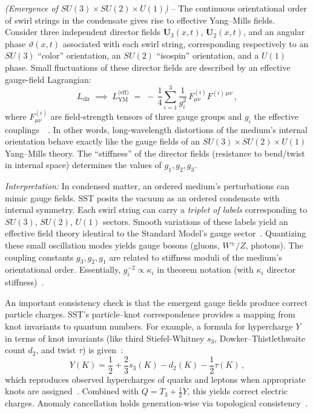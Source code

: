 \documentclass[aps,onecolumn,10pt,nofootinbib]{revtex4}
\begin{document}
	\begin{tcolorbox}[title=Theorem 6.1: Emergent Yang–Mills Fields]
		\emph{(Emergence of $SU(3)\times SU(2)\times U(1)$)} – The continuous orientational order of swirl strings in the condensate gives rise to effective Yang–Mills fields. Consider three independent director fields $\mathbf{U}_3(x,t)$, $\mathbf{U}_2(x,t)$, and an angular phase $\vartheta(x,t)$ associated with each swirl string, corresponding respectively to an $SU(3)$ “color” orientation, an $SU(2)$ “isospin” orientation, and a $U(1)$ phase. Small fluctuations of these director fields are described by an effective gauge-field Lagrangian:
		\[
			L_{\text{dir}} \;\implies\; L_{\text{YM}}^{\text{(eff)}} \;=\; -\,\frac{1}{4}\sum_{i=1}^3 \frac{1}{g_i^2}\,F^{(i)}_{\mu\nu} F^{(i)\,\mu\nu}\,,
		\]
		where $F_{\mu\nu}^{(i)}$ are field-strength tensors of three gauge groups and $g_i$ the effective couplings~\cite{index81}~\cite{index82}. In other words, long-wavelength distortions of the medium’s internal orientation behave exactly like the gauge fields of an $SU(3)\times SU(2)\times U(1)$ Yang–Mills theory. The “stiffness” of the director fields (resistance to bend/twist in internal space) determines the values of $g_1, g_2, g_3$.
	\end{tcolorbox}

	\noindent \textit{Interpretation:} In condensed matter, an ordered medium’s perturbations can mimic gauge fields. SST posits the vacuum as an ordered condensate with internal symmetry. Each swirl string can carry a \emph{triplet of labels} corresponding to $SU(3)$, $SU(2)$, $U(1)$ sectors. Smooth variations of these labels yield an effective field theory identical to the Standard Model’s gauge sector~\cite{index83}. Quantizing these small oscillation modes yields gauge bosons (gluons, $W^\pm/Z$, photons). The coupling constants $g_{3}, g_{2}, g_{1}$ are related to stiffness moduli of the medium’s orientational order. Essentially, $g_i^{-2} \propto \kappa_i$ in theorem notation (with $\kappa_i$ director stiffness)~\cite{index84}.

	An important consistency check is that the emergent gauge fields produce correct particle charges. SST’s particle–knot correspondence provides a mapping from knot invariants to quantum numbers. For example, a formula for hypercharge $Y$ in terms of knot invariants (like third Stiefel-Whitney $s_3$, Dowker–Thistlethwaite count $d_2$, and twist $\tau$) is given~\cite{index85}:
	\[
		Y (K) = \frac{1}{2} + \frac{2}{3}s_3(K) - d_2(K) - \frac{1}{2}\tau(K)\,,
	\]
	which reproduces observed hypercharges of quarks and leptons when appropriate knots are assigned~\cite{index86}. Combined with $Q = T_3 + \frac{1}{2}Y$, this yields correct electric charges. Anomaly cancellation holds generation-wise via topological consistency~\cite{index87}.
\end{document}
